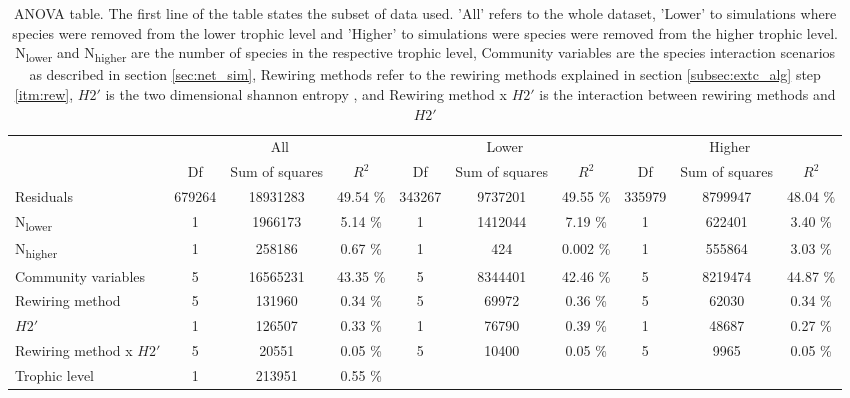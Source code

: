 \documentclass[12pt,a4paper]{article}
\begin{document}
\begin{landscape}
\begin{table}
\label{tab:anova}
\caption{ANOVA table. The first line of the table states the subset of data used. 'All' refers to the whole dataset, 'Lower' to simulations where species were removed from the lower trophic level and 'Higher' to simulations were species were removed from the higher trophic level. N\textsubscript{lower} and N\textsubscript{higher} are the number of species in the respective trophic level, Community variables are the species interaction scenarios as described in section \ref{sec:net_sim}, Rewiring methods refer to the rewiring methods explained in section \ref{subsec:extc_alg} step \ref{itm:rew}, $H2'$ is the two dimensional shannon entropy \parencite{Blüthgen2006}, and Rewiring method x $H2'$ is the interaction between rewiring methods and $H2'$}
\begin{tabularx}{\linewidth}{@{} X *9{c} @{}}
\toprule
  & \multicolumn{3}{c}{All} & \multicolumn{3}{c}{Lower} & \multicolumn{3}{c}{Higher} \\ \cmidrule(l){2-4} \cmidrule(l){5-7} \cmidrule(l){8-10}
  & Df & Sum of squares & $R^2$ & Df & Sum of squares & $R^2$ & Df & Sum of squares & $R^2$  \\ \midrule
Residuals & 679264 & 18931283 & 49.54 \% & 343267 & 9737201 & 49.55 \% & 335979 & 8799947 & 48.04 \%\\ 
N\textsubscript{lower} & 1 & 1966173 & 5.14 \% & 1 & 1412044 & 7.19 \% & 1 & 622401 & 3.40 \%\\
N\textsubscript{higher} & 1 & 258186 & 0.67 \% & 1 & 424 & 0.002 \% & 1 & 555864 & 3.03 \%\\
Community variables & 5 & 16565231 & 43.35 \% & 5 & 8344401 & 42.46 \% & 5 & 8219474 & 44.87 \%\\
Rewiring method & 5 & 131960 & 0.34 \% & 5 & 69972 & 0.36 \% & 5 & 62030 & 0.34 \%\\ 
$H2'$ & 1 & 126507 & 0.33 \% & 1 & 76790 & 0.39 \% & 1 & 48687 & 0.27 \%\\
Rewiring method x $H2'$ & 5 & 20551 & 0.05 \% & 5 & 10400 & 0.05 \% & 5 & 9965 & 0.05 \%\\ 
Trophic level & 1 & 213951 & 0.55 \%  \\ \bottomrule
\end{tabularx}
\end{table}
\end{landscape}



\begin{multicols}{2}[\printbibheading]
\printbibliography[heading=none]
\end{multicols}
\end{document}
